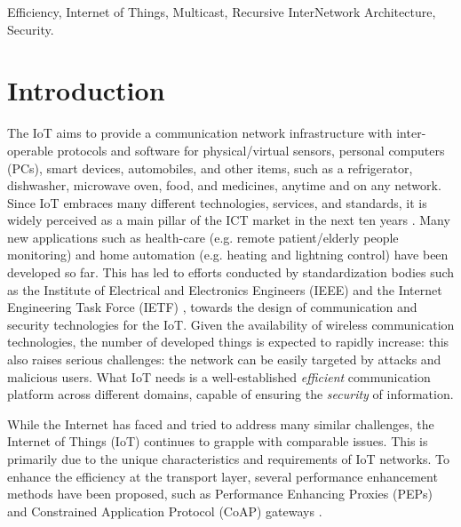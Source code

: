 \documentclass{ieeeaccess}
\begin{document}
\begin{keywords}
Efficiency, Internet of Things, Multicast, Recursive InterNetwork Architecture, Security.
\end{keywords}

\titlepgskip=-21pt

\maketitle

\section{Introduction}
\label{sec:intro}
The IoT aims to provide a communication network infrastructure with inter-operable protocols and software for physical/virtual sensors, personal computers (PCs), smart devices, automobiles, and other items, such as a refrigerator, dishwasher, microwave oven, food, and medicines, anytime and on any network. Since IoT embraces many different technologies, services, and standards, it is widely perceived as a main pillar of the ICT market in the next ten years \cite{Alaba201710}. Many new applications such as health-care (e.g. remote patient/elderly people monitoring) and home automation (e.g. heating and lightning control) have been developed so far. This has led to efforts conducted by standardization bodies such as the Institute of Electrical and Electronics Engineers (IEEE) and the Internet Engineering Task Force (IETF) \cite{rfc8576}, towards the design of communication and security technologies for the IoT. Given the availability of wireless communication technologies, the number of developed things is expected to rapidly increase: this also raises serious challenges: the network can be easily targeted by attacks and malicious users. What IoT needs is a well-established \textit{efficient} communication platform across different domains, capable of ensuring the \textit{security} of information.

While the Internet has faced and tried to address many similar challenges, the Internet of Things (IoT) continues to grapple with comparable issues. This is primarily due to the unique characteristics and requirements of IoT networks. To enhance the efficiency at the transport layer, several performance enhancement methods have been proposed, such as Performance Enhancing Proxies (PEPs) \cite{caini2007pepsal} and Constrained Application Protocol (CoAP) gateways \cite{rfc7252}.
\end{document}
